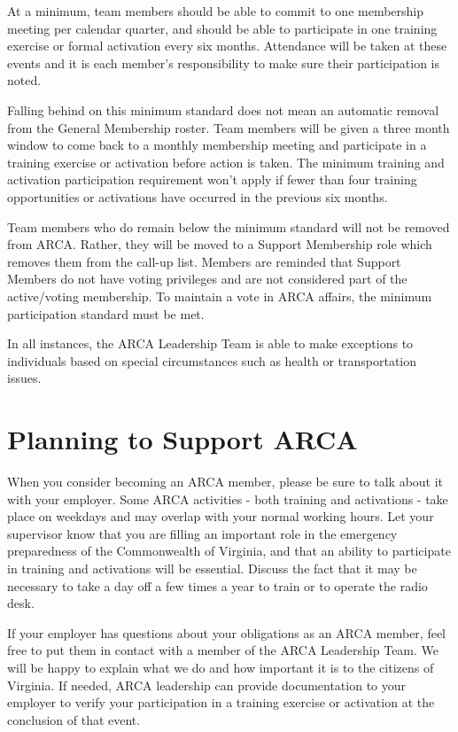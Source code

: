 \documentclass[pdflatex,letterpaper,twoside,12pt]{book}
\begin{document}
At a minimum, team members should be able to commit to one membership meeting per calendar quarter, and should be able to participate in one training exercise or formal activation every six months.  Attendance will be taken at these events and it is each member's responsibility to make sure their participation is noted.

Falling behind on this minimum standard does not mean an automatic removal from the General Membership roster.  Team members will be given a three month window to come back to a monthly membership meeting and participate in a training exercise or activation before action is taken.  The minimum training and activation participation requirement won't apply if fewer than four training opportunities or activations have occurred in the previous six months.

Team members who do remain below the minimum standard will not be removed from ARCA.  Rather, they will be moved to a Support Membership role which removes them from the call-up list.  Members are reminded that Support Members do not have voting privileges and are not considered part of the active/voting membership.  To maintain a vote in ARCA affairs, the minimum participation standard must be met.

In all instances, the ARCA Leadership Team is able to make exceptions to individuals based on special circumstances such as health or transportation issues.


\section{Planning to Support ARCA}

When you consider becoming an ARCA member, please be sure to talk about it with your employer.  Some ARCA activities - both training and activations - take place on weekdays and may overlap with your normal working hours.  Let your supervisor know that you are filling an important role in the emergency preparedness of the Commonwealth of Virginia, and that an ability to participate in training and activations will be essential.  Discuss the fact that it may be necessary to take a day off a few times a year to train or to operate the radio desk.

If your employer has questions about your obligations as an ARCA member, feel free to put them in contact with a member of the ARCA Leadership Team.  We will be happy to explain what we do and how important it is to the citizens of Virginia.  If needed, ARCA leadership can provide documentation to your employer to verify your participation in a training exercise or activation at the conclusion of that event.
\end{document}
